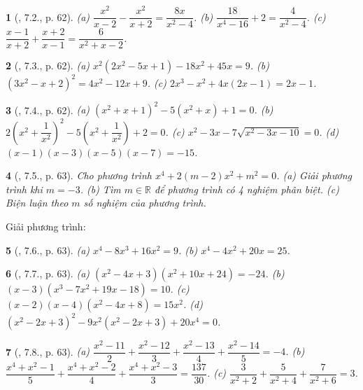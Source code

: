 \documentclass{article}
\newtheorem{baitoan}{}
\begin{document}
\begin{baitoan}[\cite{Binh_boi_duong_Toan_9_tap_2}, 7.2., p. 62]
	(a) $\dfrac{x^2}{x - 2} - \dfrac{x^2}{x + 2} = \dfrac{8x}{x^2 - 4}$. (b) $\dfrac{18}{x^4 - 16} + 2 = \dfrac{4}{x^2 - 4}$. (c) $\dfrac{x - 1}{x + 2} + \dfrac{x + 2}{x - 1} = \dfrac{6}{x^2 + x - 2}$.
\end{baitoan}

\begin{baitoan}[\cite{Binh_boi_duong_Toan_9_tap_2}, 7.3., p. 62]
	(a) $x^2(2x^2 - 5x + 1) - 18x^2 + 45x = 9$. (b) $(3x^2 - x + 2)^2 = 4x^2 - 12x + 9$. (c) $2x^3 - x^2 + 4x(2x - 1) = 2x - 1$.
\end{baitoan}

\begin{baitoan}[\cite{Binh_boi_duong_Toan_9_tap_2}, 7.4., p. 62]
	(a) $(x^2 + x + 1)^2 - 5(x^2 + x) + 1 = 0$. (b) $2\left(x^2 + \dfrac{1}{x^2}\right)^2 - 5\left(x^2 + \dfrac{1}{x^2}\right) + 2 = 0$. (c) $x^2 - 3x - 7\sqrt{x^2 - 3x - 10} = 0$. (d) $(x - 1)(x - 3)(x - 5)(x - 7) = -15$.
\end{baitoan}

\begin{baitoan}[\cite{Binh_boi_duong_Toan_9_tap_2}, 7.5., p. 63]
	Cho phương trình $x^4 + 2(m - 2)x^2 + m^2 = 0$. (a) Giải phương trình khi $m = -3$. (b) Tìm $m\in\mathbb{R}$ để phương trình có 4 nghiệm phân biệt. (c) Biện luận theo $m$ số nghiệm của phương trình.
\end{baitoan}
Giải phương trình:

\begin{baitoan}[\cite{Binh_boi_duong_Toan_9_tap_2}, 7.6., p. 63]
	(a) $x^4 - 8x^3 + 16x^2 = 9$. (b) $x^4 - 4x^2 + 20x = 25$.
\end{baitoan}

\begin{baitoan}[\cite{Binh_boi_duong_Toan_9_tap_2}, 7.7., p. 63]
	(a) $(x^2 - 4x + 3)(x^2 + 10x + 24) = -24$. (b) $(x - 3)(x^3 - 7x^2 + 19x - 18) = 10$. (c) $(x - 2)(x - 4)(x^2 - 4x + 8) = 15x^2$. (d) $(x^2 - 2x + 3)^2 - 9x^2(x^2 - 2x + 3) + 20x^4 = 0$.
\end{baitoan}

\begin{baitoan}[\cite{Binh_boi_duong_Toan_9_tap_2}, 7.8., p. 63]
	(a) $\dfrac{x^2 - 11}{2} + \dfrac{x^2 - 12}{3} + \dfrac{x^2 - 13}{4} + \dfrac{x^2 - 14}{5} = -4$. (b) $\dfrac{x^4 + x^2 - 1}{5} + \dfrac{x^4 + x^2 - 2}{4} + \dfrac{x^4 + x^2 - 3}{3} = \dfrac{137}{30}$. (c) $\dfrac{3}{x^2 + 2} + \dfrac{5}{x^2 + 4} + \dfrac{7}{x^2 + 6} = 3$.
\end{baitoan}
\end{document}

